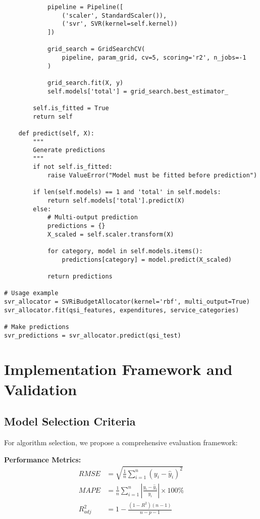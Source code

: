 \begin{lstlisting}
            pipeline = Pipeline([
                ('scaler', StandardScaler()),
                ('svr', SVR(kernel=self.kernel))
            ])
            
            grid_search = GridSearchCV(
                pipeline, param_grid, cv=5, scoring='r2', n_jobs=-1
            )
            
            grid_search.fit(X, y)
            self.models['total'] = grid_search.best_estimator_
        
        self.is_fitted = True
        return self
    
    def predict(self, X):
        """
        Generate predictions
        """
        if not self.is_fitted:
            raise ValueError("Model must be fitted before prediction")
        
        if len(self.models) == 1 and 'total' in self.models:
            return self.models['total'].predict(X)
        else:
            # Multi-output prediction
            predictions = {}
            X_scaled = self.scaler.transform(X)
            
            for category, model in self.models.items():
                predictions[category] = model.predict(X_scaled)
            
            return predictions

# Usage example
svr_allocator = SVRiBudgetAllocator(kernel='rbf', multi_output=True)
svr_allocator.fit(qsi_features, expenditures, service_categories)

# Make predictions
svr_predictions = svr_allocator.predict(qsi_test)
\end{lstlisting}

\section{Implementation Framework and Validation}

\subsection{Model Selection Criteria}

For algorithm selection, we propose a comprehensive evaluation framework:

\textbf{Performance Metrics:}
\begin{align}
RMSE &= \sqrt{\frac{1}{n}\sum_{i=1}^{n}(y_i - \hat{y}_i)^2} \\
MAPE &= \frac{1}{n}\sum_{i=1}^{n}\left|\frac{y_i - \hat{y}_i}{y_i}\right| \times 100\% \\
R^2_{adj} &= 1 - \frac{(1-R^2)(n-1)}{n-p-1}
\end{align}

